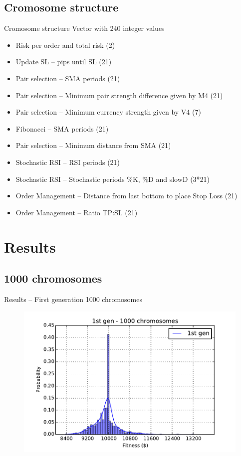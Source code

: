 \documentclass[12pt,portuguese]{beamer}
\begin{document}
\subsection{Cromosome structure}
\begin{frame}{Cromosome structure}
	Vector with 240 integer values
	\begin{itemize}
		\item Risk per order and total risk (2)
		\item Update SL -- pips until SL (21)
		\item Pair selection -- SMA periods (21)
		\item Pair selection -- Minimum pair strength difference given by M4 (21)
		\item Pair selection -- Minimum currency strength given by V4 (7)
		\item Fibonacci -- SMA periods (21)
		\item Pair selection -- Minimum distance from SMA (21)
		\item Stochastic RSI -- RSI periods (21)
		\item Stochastic RSI -- Stochastic periods \%K, \%D and slowD (3*21)
		\item Order Management -- Distance from last bottom to place Stop Loss (21)
		\item Order Management -- Ratio TP:SL (21)
	\end{itemize}
\end{frame}

\section{Results}
\subsection{1000 chromosomes}
\begin{frame}{Results -- First generation 1000 chromosomes}
	\begin{figure}[h]
	\centering
	\includegraphics[width=0.9\columnwidth]{images/01r_1000.pdf}
	\end{figure}
\end{frame}
\end{document}
